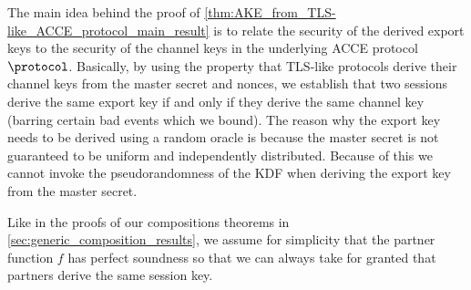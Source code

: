 The main idea behind the proof of \cref{thm:AKE_from_TLS-like_ACCE_protocol_main_result} is to relate the security of the derived export keys to the security of the channel keys in the underlying ACCE protocol $\protocol$.
Basically, 
by using the property that TLS-like protocols derive their channel keys from the master secret and nonces,
we establish that two sessions derive the same export key if and only if they derive the same channel key
(barring certain bad events which we bound).
The reason why the export key needs to be derived using a random oracle is because the master secret is not guaranteed to be uniform and independently distributed.
Because of this we cannot invoke the pseudorandomness of the KDF when deriving the export key from the master secret. 



Like in the proofs of our compositions theorems in \cref{sec:generic_composition_results},
we assume for simplicity that the partner function $f$ has perfect soundness so that we can always take for granted that partners derive the same session key.




